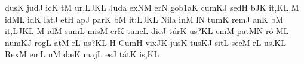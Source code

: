\sgn dus\punctum K\egn
\spatium
\sgn jud\punctum J\egn
\sgn {}ic\punctum K\egn
{}t\punctum M\egn
\sgn {}u{r,}\porrectus LJK\augmentum L\egn
\spatium
\divisiofinalis
\spatium
\sgn Jud\punctum a\egn
\sgn {}ex\clivis NM\egn
\spatium
\sgn {}er\punctum N\egn
\sgn go{}\episem b1\clivis aK\egn
\spatium
\sgn cum\clivis KJ\egn
\spatium
\sgn sed\punctum H\egn
{}b\pes JK\egn
\sgn {}i{t,}\punctum K\augmentum L\egn
\spatium
\divisiominor
\spatium
\custos M
\lineaproxima
{}id\clivis ML\egn
{}id\punctum K\egn
\spatium
\sgn lat\punctum J\egn
\sgn {}et\punctum H\egn
\spatium
\sgn {}ap\punctum J\egn
\sgn par\punctum K\egn
{}b\punctum M\egn
\sgn {}i{t:}\porrectus LJK\augmentum L\egn
\spatium
\divisiominor
\spatium
\sgn Nil\punctum a\egn
\spatium
\sgn {}in\punctum M\egn
{}l\punctum N\egn
\sgn tum\punctum K\egn
\spatium
\sgn rem\punctum J\egn
\sgn {}an\punctum K\egn
{}b\punctum M\egn
\sgn {}i{t,}\porrectus LJK\augmentum L\egn
\spatium
\divisiofinalis
\spatium
\custos M
\Internote
\lineaproxima
{}id\punctum M\egn
\spatium
\sgn sum\punctum L\egn
\spatium
\sgn mis\punctum M\egn
\sgn {}er\punctum K\egn
\spatium
\sgn tu{nc}\punctum L\egn
\spatium
\sgn dic\punctum J\egn
\sgn t{\'u}r\punctum K\egn
\sgn {}u{s?}\punctum K\augmentum L\egn
\spatium
\divisiominor
\spatium
{}em\punctum M\egn
\spatium
\sgn pat\pes MN\egn
\sgn r{\'o}-\clivis ML\egn
\sgn num\clivis KJ\egn
\spatium
\sgn rog\punctum L\egn
\sgn {}at\punctum M\egn
{}r\punctum L\egn
\sgn {}u{s?}\punctum K\augmentum L\egn
\spatium
\divisiominor
\spatium
\custos H
\Internote
\lineaproxima
\sgn Cum\punctum H\egn
\spatium
\sgn vix\pes JK\egn
\spatium
\sgn jus\punctum K\egn
\sgn tus\clivis KJ\egn
\spatium
\sgn sit\punctum L\egn
\spatium
\sgn sec\punctum M\egn
{}r\punctum L\egn
\sgn {}u{s.}\punctum K\augmentum L\egn
\spatium
\divisiofinalis
\spatium
\sgn Rex\punctum M\egn
\spatium
{}em\punctum L\egn
{}n\punctum M\egn
\sgn d{\ae}{}\punctum K\egn
\spatium
\sgn maj\punctum L\egn
\sgn {}es\punctum J\egn
\sgn t{\'a}t\punctum K\egn
\sgn {}i{s,}\punctum K\augmentum L\egn
\spatium
\divisiominor
\spatium
